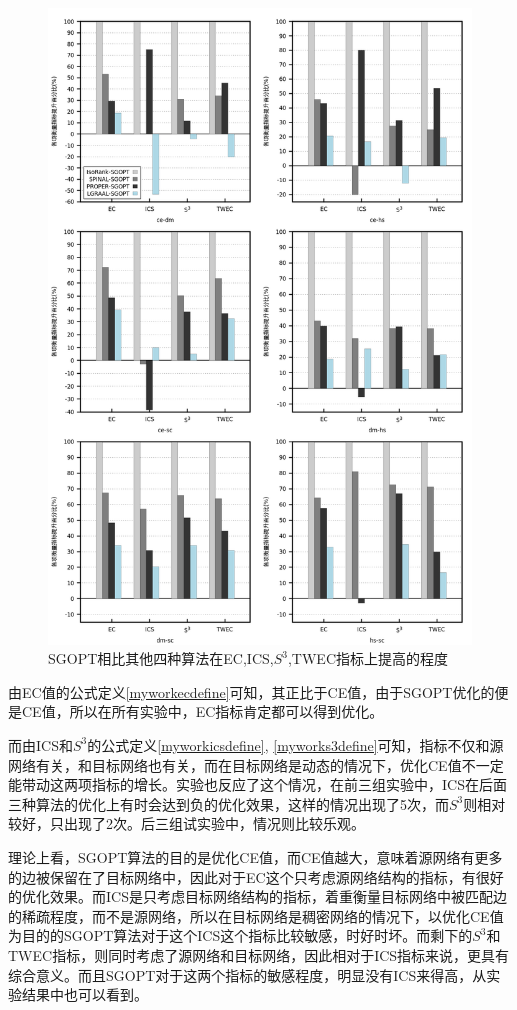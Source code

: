 \begin{figure}[htbp]
\centering
\includegraphics[width=\textwidth]{pic/other.png}
\caption{SGOPT相比其他四种算法在EC,ICS,$S^3$,TWEC指标上提高的程度} 
\label{fig:other}
\end{figure}

由EC值的公式定义\ref{myworkecdefine}可知，其正比于CE值，由于SGOPT优化的便是CE值，所以在所有实验中，EC指标肯定都可以得到优化。

而由ICS和$S^3$的公式定义\ref{myworkicsdefine}, \ref{myworks3define}可知，指标不仅和源网络有关，和目标网络也有关，而在目标网络是动态的情况下，优化CE值不一定能带动这两项指标的增长。实验也反应了这个情况，在前三组实验中，ICS在后面三种算法的优化上有时会达到负的优化效果，这样的情况出现了5次，而$S^3$则相对较好，只出现了2次。后三组试实验中，情况则比较乐观。

理论上看，SGOPT算法的目的是优化CE值，而CE值越大，意味着源网络有更多的边被保留在了目标网络中，因此对于EC这个只考虑源网络结构的指标，有很好的优化效果。而ICS是只考虑目标网络结构的指标，着重衡量目标网络中被匹配边的稀疏程度，而不是源网络，所以在目标网络是稠密网络的情况下，以优化CE值为目的的SGOPT算法对于这个ICS这个指标比较敏感，时好时坏。而剩下的$S^3$和TWEC指标，则同时考虑了源网络和目标网络，因此相对于ICS指标来说，更具有综合意义。而且SGOPT对于这两个指标的敏感程度，明显没有ICS来得高，从实验结果中也可以看到。



